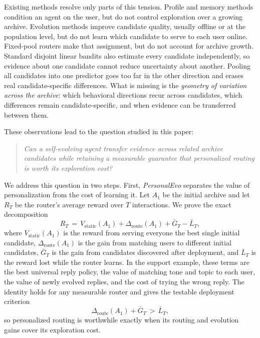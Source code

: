 \documentclass{article} %
\begin{document}
Existing methods resolve only parts of this tension. Profile and memory methods condition an agent on the user, but do not control exploration over a growing archive. Evolution methods improve candidate quality, usually offline or at the population level, but do not learn which candidate to serve to each user online. Fixed-pool routers make that assignment, but do not account for archive growth. Standard disjoint linear bandits also estimate every candidate independently, so evidence about one candidate cannot reduce uncertainty about another. Pooling all candidates into one predictor goes too far in the other direction and erases real candidate-specific differences. What is missing is the \emph{geometry of variation across the archive}: which behavioral directions recur across candidates, which differences remain candidate-specific, and when evidence can be transferred between them.

These observations lead to the question studied in this paper:
\begin{quote}
\emph{Can a self-evolving agent transfer evidence across related archive candidates while retaining a measurable guarantee that personalized routing is worth its exploration cost?}
\end{quote}

We address this question in two steps. First, \emph{PersonalEvo} separates the value of personalization from the cost of learning it. Let $A_1$ be the initial archive and let $R_T$ be the router's average reward over $T$ interactions. We prove the exact decomposition
\begin{equation}
\label{eq:intro-decomp}
R_T
\,=\,
V_{\mathrm{static}}(A_1)
+
\Delta_{\mathrm{route}}(A_1)
+
\bar G_T
-
\bar L_T ,
\end{equation}
where $V_{\mathrm{static}}(A_1)$ is the reward from serving everyone the best single initial candidate, $\Delta_{\mathrm{route}}(A_1)$ is the gain from matching users to different initial candidates, $\bar G_T$ is the gain from candidates discovered after deployment, and $\bar L_T$ is the reward lost while the router learns. In the support example, these terms are the best universal reply policy, the value of matching tone and topic to each user, the value of newly evolved replies, and the cost of trying the wrong reply. The identity holds for any measurable router and gives the testable deployment criterion
\begin{equation}
\label{eq:intro-dominance}
\Delta_{\mathrm{route}}(A_1) + \bar G_T \,>\, \bar L_T ,
\end{equation}
so personalized routing is worthwhile exactly when its routing and evolution gains cover its exploration cost.
\end{document}
